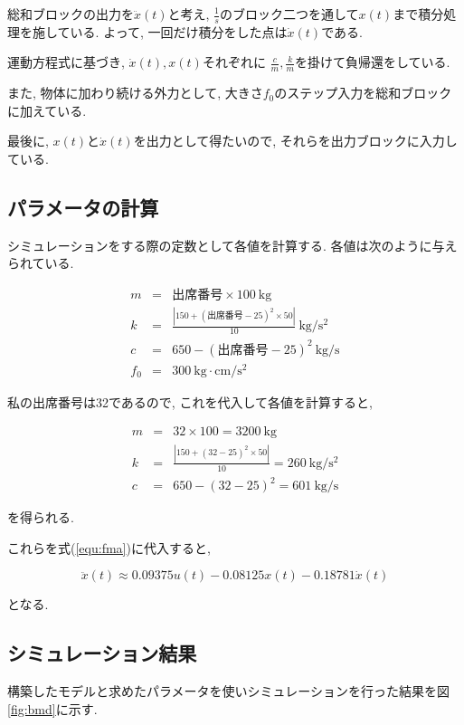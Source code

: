 \documentclass[titlepage]{jsarticle}
\begin{document}
        総和ブロックの出力を$\ddot{x}(t)$と考え,
        $\displaystyle \frac{1}{s}$のブロック二つを通して$x(t)$まで積分処理を施している.
        よって, 一回だけ積分をした点は$\dot{x}(t)$である.

        運動方程式に基づき, $\dot{x} (t), x(t)$それぞれに
        $\displaystyle \frac{c}{m}, \frac{k}{m}$を掛けて負帰還をしている.

        また, 物体に加わり続ける外力として, 大きさ$f_0$のステップ入力を総和ブロックに加えている.

        最後に, $x(t)$と$\dot{x}(t)$を出力として得たいので, それらを出力ブロックに入力している.

    \subsection{パラメータの計算} \label{sec:para}
        シミュレーションをする際の定数として各値を計算する.
        各値は次のように与えられている.

        \begin{eqnarray*}
            m &=& 出席番号\times 100 \ \mathrm{kg} \\
            k &=& \frac{|150 + (出席番号-25)^2\times 50|}{10} \ \mathrm{kg/s^2} \\
            c &=& 650-(出席番号-25)^2 \ \mathrm{kg/s} \\
            f_0 &=& 300 \ \mathrm{kg \cdot cm/s^2}
        \end{eqnarray*}

        私の出席番号は32であるので,
        これを代入して各値を計算すると,

        \begin{eqnarray*}
            m &=& 32 \times 100 = 3200 \ \mathrm{kg} \\
            k &=& \frac{|150 + (32-25)^2\times 50|}{10} = 260 \ \mathrm{kg/s^2} \\
            c &=& 650-(32-25)^2 = 601 \ \mathrm{kg/s}
        \end{eqnarray*}

        を得られる.

        これらを式(\ref{equ:fma})に代入すると,

        \[
            \ddot{x}(t) \approx 0.09375 u(t) -0.08125x(t) -0.18781 \dot{x}(t)
        \]

        となる.
        
    \subsection{シミュレーション結果}
        構築したモデルと求めたパラメータを使いシミュレーションを行った結果を図\ref{fig:bmd}に示す.
\end{document}
